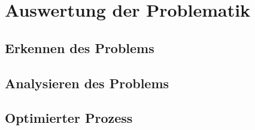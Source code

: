\chapter{Auswertung der Problematik}
\section{Erkennen des Problems}
\section{Analysieren des Problems}
\section{Optimierter Prozess}
